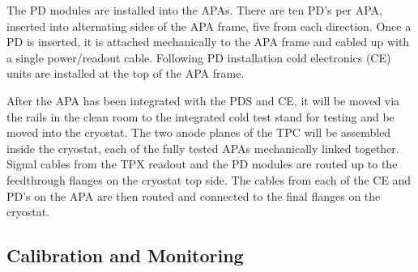 The PD modules are installed into the APAs. There are ten PD's per APA, inserted into alternating sides of the APA frame, five from each direction. Once a PD is inserted, it is attached mechanically to the APA frame  and cabled up with a single power/readout cable. Following PD installation cold electronics (CE) units are installed at the top of the APA frame.

After the APA has been integrated with the PDS and CE, it will be moved via the rails in the clean room to the integrated cold test stand for testing and be moved into the cryostat. The two anode planes of the TPC will be assembled inside the cryostat, each of the fully tested APAs mechanically linked together. Signal cables from the TPX readout and the PD modules are routed up to the feedthrough flanges on the cryostat top side. The cables from each of the CE and PD's on the APA are then routed and connected to the final flanges on the cryostat.


\subsection{Calibration and Monitoring}
\label{sec:fdsp-pd-install-calib}



